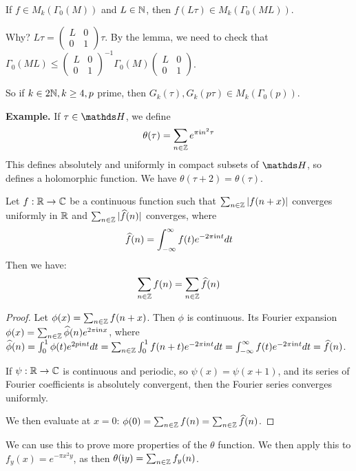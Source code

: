 \documentclass[10pt,a4paper]{article}
\begin{document}
If $f \in M_k(\Gamma_0(M))$ and $L\in \mathbb{N}$, then $f(L\tau) \in M_k(\Gamma_0(ML))$.

Why? $L\tau = \begin{pmatrix}L&0\\0&1 \end{pmatrix}\tau$. By the lemma, we need to check that $\Gamma_0(ML) \leq \begin{pmatrix}L&0\\0&1 \end{pmatrix}^{-1}\Gamma_0(M)\begin{pmatrix}L&0\\0&1 \end{pmatrix}$.

So if $k \in 2\mathbb{N}, k\geq4, p$ prime, then $G_k(\tau), G_k(p\tau) \in M_k(\Gamma_0(p))$.

\textbf{Example.} If $\tau \in \H$, we define
\[\theta(\tau) = \sum_{n \in \mathbb{Z}}e^{\pi\mathfrak{i} n^2\tau}\]
This defines absolutely and uniformly in compact subsets of $\H$, so defines a holomorphic function. We have $\theta(\tau+2) = \theta(\tau)$.
\begin{proposition}
  Let $f:\mathbb{R} \to \mathbb{C}$ be a continuous function such that $\sum_{n \in \mathbb{Z}}|f(n+x)|$ converges uniformly in $\mathbb{R}$ and $\sum_{n \in \mathbb{Z}}|\widehat{f}(n)|$ converges, where
  \[\widehat{f}(n) = \int_{-\infty}^\infty f(t)e^{-2\pi\mathfrak{i} n t}dt\]
  Then we have:
  \[\sum_{n \in \mathbb{Z}}f(n) = \sum_{n \in \mathbb{Z}}\widehat{f}(n)\]
\end{proposition}
\begin{proof}
  Let $\phi(x) = \sum_{n \in \mathbb{Z}}f(n+x)$. Then $\phi$ is continuous. Its Fourier expansion $\phi(x) = \sum_{n \in \mathbb{Z}}\widehat{\phi}(n)e^{2\pi\mathfrak{i} n x}$, where $\widehat{\phi}(n) = \int_0^1 \phi(t) e^{2p\mathfrak{i} n t}dt = \sum_{n \in \mathbb{Z}}\int_0^1 f(n+t)e^{-2\pi\mathfrak{i} n t}dt = \int_{-\infty}^\infty f(t)e^{-2\pi\mathfrak{i} n t}dt= \widehat{f}(n)$.

  If $\psi : \mathbb{R} \to \mathbb{C}$ is continuous and periodic, so $\psi(x) = \psi(x+1)$, and its series of Fourier coefficients is absolutely convergent, then the Fourier series converges uniformly.

  We then evaluate at $x= 0$: $\phi(0)= \sum_{n \in \mathbb{Z}}f(n) = \sum_{n \in \mathbb{Z}}\widehat{f}(n)$.
\end{proof}
We can use this to prove more properties of the $\theta$ function. We then apply this to $f_y(x) = e^{-\pi x^2 y}$, as then $\theta(\mathfrak{i} y) = \sum_{n \in \mathbb{Z}} f_y(n)$.
\end{document}
